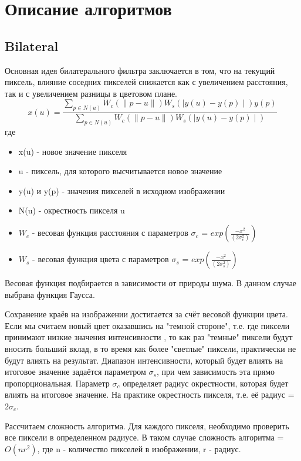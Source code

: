 \section{Описание алгоритмов}
\subsection{Bilateral}
Основная идея билатерального фильтра заключается в том, что на текущий пиксель, влияние соседних пикселей снижается как с
увеличением расстояния, так и с увеличением разницы в цветовом плане. 
\begin{equation}
x(u) = \frac{\sum_{p\in N(u)}W_c(\parallel p - u\parallel)W_s(\mid y(u) - y(p)\mid)y(p)}
{\sum_{p\in N(u)}W_c(\parallel p - u\parallel)W_s(\mid y(u) - y(p)\mid)}
\end{equation}
где
\begin{itemize}
\item x(u) - новое значение пикселя
\item u - пиксель, для которого высчитывается новое значение
\item y(u) и y(p) - значения пикселей в исходном изображении
\item N(u) - окрестность пикселя u
\item $W_c$ - весовая функция расстояния с параметров $\sigma_c$ = $exp(\frac{-x^2}{(2\sigma_c^2)})$
\item $W_s$ - весовая функция цвета с параметров $\sigma_s$ = $exp(\frac{-x^2}{(2\sigma_s^2)})$
\end{itemize}

Весовая функция подбирается в зависимости от природы шума. В данном случае выбрана функция Гаусса.

Сохранение краёв на изображении достигается за счёт весовой функции цвета. Если мы считаем новый цвет оказавшись на "темной стороне", т.е. где пиксели принимают низкие значения интенсивности , то как раз "темные" пиксели будут вносить больший вклад, в то время как более "светлые" пиксели, практически не будут влиять на результат. Диапазон интенсивности, который будет влиять на итоговое значение задаётся параметром $\sigma_s$,  при чем зависимость эта прямо пропорциональная.
Параметр $\sigma_c$ определяет радиус окрестности, которая будет влиять на итоговое значение. На практике окрестность пикселя, т.е. её радиус = 2$\sigma_c$.

Рассчитаем сложность алгоритма. Для каждого пикселя, необходимо проверить все пиксели в определенном радиусе. В таком случае сложность алгоритма = $O(nr^2)$, где n - количество пикселей в изображении, r - радиус. 

